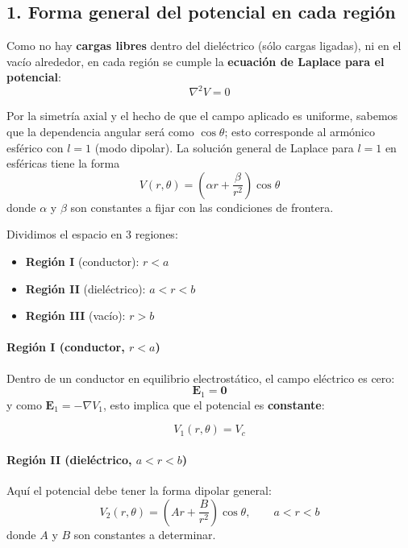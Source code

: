 \documentclass{article}
\begin{document}
\subsection*{1. Forma general del potencial en cada región}

Como no hay \textbf{cargas libres} dentro del dieléctrico (sólo cargas ligadas), ni en el vacío alrededor, en cada región se cumple la \textbf{ecuación de Laplace para el potencial}:
\begin{equation}
\nabla^{2}V = 0
\label{eq:laplace}
\end{equation}

Por la simetría axial y el hecho de que el campo aplicado es uniforme, sabemos que la dependencia angular será como $\cos\theta$; esto corresponde al armónico esférico con $l=1$ (modo dipolar).  
La solución general de Laplace para $l=1$ en esféricas tiene la forma
\[
V(r,\theta) = \left( \alpha r + \frac{\beta}{r^{2}} \right)\cos\theta
\]
donde $\alpha$ y $\beta$ son constantes a fijar con las condiciones de frontera.

Dividimos el espacio en 3 regiones:

\begin{itemize}
  \item \textbf{Región I} (conductor): $r < a$
  \item \textbf{Región II} (dieléctrico): $a < r < b$
  \item \textbf{Región III} (vacío): $r > b$
\end{itemize}

\paragraph{Región I (conductor, $r<a$)}

Dentro de un conductor en equilibrio electrostático, el campo eléctrico es cero:
\[
\mathbf{E}_{1} = \mathbf{0}
\]
y como $\mathbf{E}_{1} = -\nabla V_{1}$, esto implica que el potencial es \textbf{constante}:

\begin{equation}
V_{1}(r,\theta) = V_{c}
\label{eq:V1}
\end{equation}

\paragraph{Región II (dieléctrico, $a<r<b$)}

Aquí el potencial debe tener la forma dipolar general:
\begin{equation}
V_{2}(r,\theta) = \left(A r + \frac{B}{r^{2}}\right)\cos\theta,
\qquad a<r<b
\label{eq:V2-general}
\end{equation}
donde $A$ y $B$ son constantes a determinar.
\end{document}

